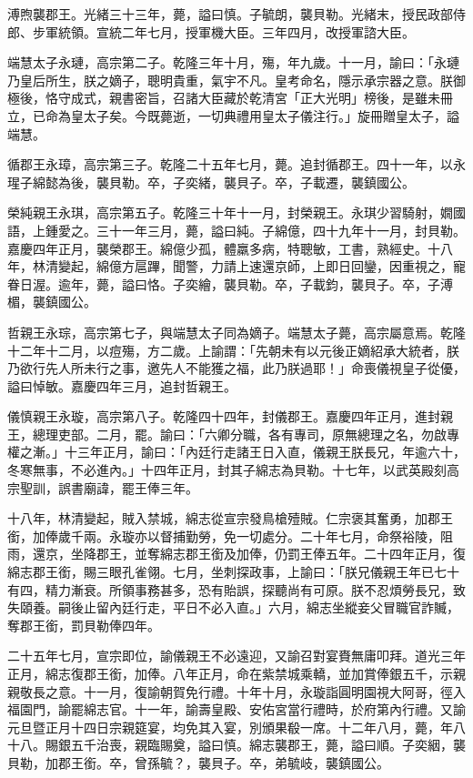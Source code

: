 \begin{pinyinscope}
溥煦襲郡王。光緒三十三年，薨，謚曰慎。子毓朗，襲貝勒。光緒末，授民政部侍郎、步軍統領。宣統二年七月，授軍機大臣。三年四月，改授軍諮大臣。

端慧太子永璉，高宗第二子。乾隆三年十月，殤，年九歲。十一月，諭曰：「永璉乃皇后所生，朕之嫡子，聰明貴重，氣宇不凡。皇考命名，隱示承宗器之意。朕御極後，恪守成式，親書密旨，召諸大臣藏於乾清宮「正大光明」榜後，是雖未冊立，已命為皇太子矣。今既薨逝，一切典禮用皇太子儀注行。」旋冊贈皇太子，謚端慧。

循郡王永璋，高宗第三子。乾隆二十五年七月，薨。追封循郡王。四十一年，以永瑆子綿懿為後，襲貝勒。卒，子奕緒，襲貝子。卒，子載遷，襲鎮國公。

榮純親王永琪，高宗第五子。乾隆三十年十一月，封榮親王。永琪少習騎射，嫺國語，上鍾愛之。三十一年三月，薨，謚曰純。子綿億，四十九年十一月，封貝勒。嘉慶四年正月，襲榮郡王。綿億少孤，體羸多病，特聰敏，工書，熟經史。十八年，林清變起，綿億方扈蹕，聞警，力請上速還京師，上即日回鑾，因重視之，寵眷日渥。逾年，薨，謚曰恪。子奕繪，襲貝勒。卒，子載鈞，襲貝子。卒，子溥楣，襲鎮國公。

哲親王永琮，高宗第七子，與端慧太子同為嫡子。端慧太子薨，高宗屬意焉。乾隆十二年十二月，以痘殤，方二歲。上諭謂：「先朝未有以元後正嫡紹承大統者，朕乃欲行先人所未行之事，邀先人不能獲之福，此乃朕過耶！」命喪儀視皇子從優，謚曰悼敏。嘉慶四年三月，追封哲親王。

儀慎親王永璇，高宗第八子。乾隆四十四年，封儀郡王。嘉慶四年正月，進封親王，總理吏部。二月，罷。諭曰：「六卿分職，各有專司，原無總理之名，勿啟專權之漸。」十三年正月，諭曰：「內廷行走諸王日入直，儀親王朕長兄，年逾六十，冬寒無事，不必進內。」十四年正月，封其子綿志為貝勒。十七年，以武英殿刻高宗聖訓，誤書廟諱，罷王俸三年。

十八年，林清變起，賊入禁城，綿志從宣宗發鳥槍殪賊。仁宗褒其奮勇，加郡王銜，加俸歲千兩。永璇亦以督捕勤勞，免一切處分。二十年七月，命祭裕陵，阻雨，還京，坐降郡王，並奪綿志郡王銜及加俸，仍罰王俸五年。二十四年正月，復綿志郡王銜，賜三眼孔雀翎。七月，坐刺探政事，上諭曰：「朕兄儀親王年已七十有四，精力漸衰。所領事務甚多，恐有貽誤，探聽尚有可原。朕不忍煩勞長兄，致失頤養。嗣後止留內廷行走，平日不必入直。」六月，綿志坐縱妾父冒職官詐贓，奪郡王銜，罰貝勒俸四年。

二十五年七月，宣宗即位，諭儀親王不必遠迎，又諭召對宴賚無庸叩拜。道光三年正月，綿志復郡王銜，加俸。八年正月，命在紫禁城乘轎，並加賞俸銀五千，示親親敬長之意。十一月，復諭朝賀免行禮。十年十月，永璇詣圓明園視大阿哥，徑入福園門，諭罷綿志官。十一年，諭壽皇殿、安佑宮當行禮時，於府第內行禮。又諭元旦暨正月十四日宗親筵宴，均免其入宴，別頒果殽一席。十二年八月，薨，年八十八。賜銀五千治喪，親臨賜奠，謚曰慎。綿志襲郡王，薨，謚曰順。子奕絪，襲貝勒，加郡王銜。卒，曾孫毓？，襲貝子。卒，弟毓岐，襲鎮國公。


\end{pinyinscope}
